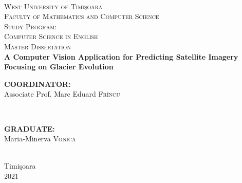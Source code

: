 \documentclass[12pt, a4paper]{report}
\begin{document}
	\begin{titlepage}
		
		\newcommand{\HRule}{\rule{\linewidth}{0.5mm}}
		
		\center
		
		\textsc{}\\[.7cm]
		
		\textsc{\LARGE West University of  Timi\c{s}oara}\\[0.5cm]
		\textsc{\Large Faculty of Mathematics and Computer Science}\\[0.5cm]
		\textsc{\large Study Program: \\Computer Science in English}\\[4.5cm]
		
		\textsc{\Huge Master Dissertation}\\[2cm]
		
		{\Huge \bfseries {A Computer Vision Application for Predicting Satellite Imagery Focusing on Glacier Evolution}}\\[6cm]
		
		\begin{minipage}{0.4\textwidth}
			\begin{flushleft} \large
				\textbf{COORDINATOR:}\\
				Associate Prof. Marc Eduard \textsc{Frîncu}
			\end{flushleft}
		\end{minipage}
		~
		\begin{minipage}{0.4\textwidth}
			\begin{flushright} \large
				\textbf{GRADUATE:} \\
				Maria-Minerva \textsc{Vonica}
			\end{flushright}
		\end{minipage}\\[0.5cm]
		
		{\large Timi\c{s}oara\\ 2021}\\
		\vfill
		
	\end{titlepage}

	
\end{document}
